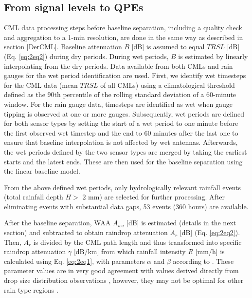 \documentclass{ctuthesis}\usepackage[]{graphicx}\usepackage[]{color}
\begin{document}
\subsection{From signal levels to QPEs} \label{paperIIMethA}

CML data processing steps before baseline separation, including a quality check and aggregation to a 1-min resolution, are done in the same way as described in section \ref{DerCML}. Baseline attenuation $B$ [dB] is assumed to equal $T\!R\!S\!L$ [dB] (Eq. \ref{eq:2eq2}) during dry periods. During wet periods, $B$ is estimated by linearly interpolating from the dry periods. Data available from both CMLs and rain gauges for the wet period identification are used. First, we identify wet timesteps for the CML data (mean $T\!R\!S\!L$ of all CMLs) using a climatological threshold \citep{schleissIdentificationDryRainy2010} defined as the 90th percentile of the rolling standard deviation of a 60-minute window. For the rain gauge data, timesteps are identified as wet when gauge tipping is observed at one or more gauges. Subsequently, wet periods are defined for both sensor types by setting the start of a wet period to one minute before the first observed wet timestep and the end to 60 minutes after the last one to ensure that baseline interpolation is not affected by wet antennas. Afterwards, the wet periods defined by the two sensor types are merged by taking the earliest starts and the latest ends. These are then used for the baseline separation using the linear baseline model.

From the above defined wet periods, only hydrologically relevant rainfall events (total rainfall depth $H >$ 2 mm) are selected for further processing. After eliminating events with substantial data gaps, 53 events (360 hours) are available.

After the baseline separation, WAA $A_{wa}$ [dB] is estimated (details in the next section) and subtracted  to obtain raindrop attenuation $A_r$ [dB] (Eq. \ref{eq:2eq2}). Then, $A_r$ is divided by the CML path length and thus transformed into specific raindrop attenuation $\gamma$ [dB/km] from which rainfall intensity $R$ [mm/h] is calculated using Eq. \ref{eq:2eq1}, with parameters $\alpha$ and $\beta$ according to \cite{recommendation2005838}. These parameter values are in very good agreement with values derived directly from drop size distribution observations \citep{chwalaCommercialMicrowaveLink2019, valtrExcessAttenuationCaused2019}, however, they may not be optimal for other rain type regions \citep{riosgaonaRainfallRetrievalCommercial2018}.
\end{document}
